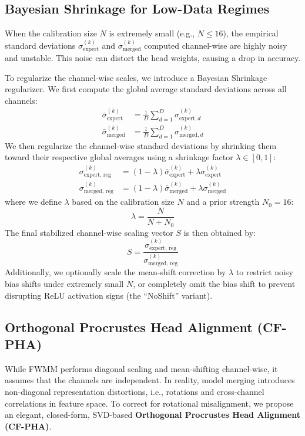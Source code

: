 \documentclass{article}
\theoremstyle{plain}
\theoremstyle{definition}
\theoremstyle{remark}
\begin{document}
\subsection{Bayesian Shrinkage for Low-Data Regimes}
When the calibration size $N$ is extremely small (e.g., $N \le 16$), the empirical standard deviations $\sigma_{\text{expert}}^{(k)}$ and $\sigma_{\text{merged}}^{(k)}$ computed channel-wise are highly noisy and unstable. This noise can distort the head weights, causing a drop in accuracy.

To regularize the channel-wise scales, we introduce a Bayesian Shrinkage regularizer. We first compute the global average standard deviations across all channels:
\begin{align}
\bar{\sigma}_{\text{expert}}^{(k)} &= \frac{1}{D}\sum_{d=1}^D \sigma_{\text{expert}, d}^{(k)} \\
\bar{\sigma}_{\text{merged}}^{(k)} &= \frac{1}{D}\sum_{d=1}^D \sigma_{\text{merged}, d}^{(k)}
\end{align}
We then regularize the channel-wise standard deviations by shrinking them toward their respective global averages using a shrinkage factor $\lambda \in [0, 1]$:
\begin{align}
\sigma_{\text{expert, reg}}^{(k)} &= (1 - \lambda) \bar{\sigma}_{\text{expert}}^{(k)} + \lambda \sigma_{\text{expert}}^{(k)} \\
\sigma_{\text{merged, reg}}^{(k)} &= (1 - \lambda) \bar{\sigma}_{\text{merged}}^{(k)} + \lambda \sigma_{\text{merged}}^{(k)}
\end{align}
where we define $\lambda$ based on the calibration size $N$ and a prior strength $N_0 = 16$:
\begin{equation}
\lambda = \frac{N}{N + N_0}
\end{equation}
The final stabilized channel-wise scaling vector $S$ is then obtained by:
\begin{equation}
S = \frac{\sigma_{\text{expert, reg}}^{(k)}}{\sigma_{\text{merged, reg}}^{(k)}}
\end{equation}
Additionally, we optionally scale the mean-shift correction by $\lambda$ to restrict noisy bias shifts under extremely small $N$, or completely omit the bias shift to prevent disrupting ReLU activation signs (the ``NoShift'' variant).

\subsection{Orthogonal Procrustes Head Alignment (CF-PHA)}
While FWMM performs diagonal scaling and mean-shifting channel-wise, it assumes that the channels are independent. In reality, model merging introduces non-diagonal representation distortions, i.e., rotations and cross-channel correlations in feature space. To correct for rotational misalignment, we propose an elegant, closed-form, SVD-based \textbf{Orthogonal Procrustes Head Alignment (CF-PHA)}.
\end{document}
